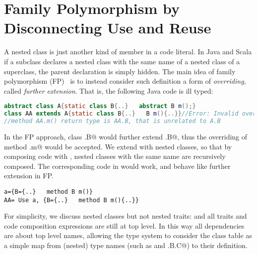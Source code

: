 \section{Family
Polymorphism by Disconnecting Use and Reuse}

A nested class is just another kind of member in a code literal.
In Java and Scala if a subclass declares a nested class with the same
name of a nested class of a superclass, the parent declaration is simply hidden.
The main idea of family polymorphism (FP)~\cite{igarashi2005lightweight,IgarashiEtAl08,nystrom2006j,Ernst06,BruceEtAl98,IgarashiViroli07,deep}
is to instead consider such definition a form of \emph{overriding},
called \emph{further extension}.
That is, the following Java code is ill typed:
\saveSpace\saveSpace\begin{lstlisting}[language=Java]
abstract class A{static class B{..}   abstract B m();}
class AA extends A{static class B{..}   B m(){..}}//Error: Invalid overriding
//method AA.m() return type is AA.B, that is unrelated to A.B
\end{lstlisting}\saveSpace\saveSpace

In the FP approach, class \Q@AA.B@ would further extend \Q@A.B@, thus the overriding of method
\Q@A.m@ would be accepted.
We extend \name with nested classes, so that 
by composing code with \use,
nested classes with the same name are recursively composed.
The corresponding code in \name would work, and behave like further
extension in FP.
\saveSpace\saveSpace\begin{lstlisting}
a={B={..}   method B m()}
AA= Use a, {B={..}   method B m(){..}}
\end{lstlisting}\saveSpace\saveSpace

For simplicity, we discuss nested classes but not nested traits:
and all traits and code composition expressions are still at top level.
In this way all dependencies are about top level names, allowing the type system 
to consider the class table as a simple map from (nested) type names
(such as \Q@A@ and \Q@A.B.C@)
to their definition.



